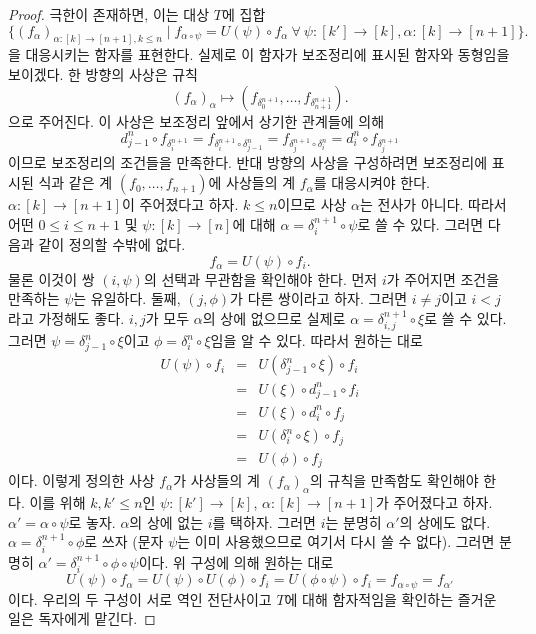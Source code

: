 \begin{proof}
극한이 존재하면, 이는 대상 $T$에 집합
$$
\{
(f_\alpha)_{\alpha : [k] \to [n + 1], k \leq n}
\mid
f_{\alpha \circ \psi} = U(\psi) \circ f_\alpha\ \forall
\ \psi : [k'] \to [k], \alpha : [k] \to [n + 1]
\}.
$$
을 대응시키는 함자를 표현한다.
실제로 이 함자가 보조정리에 표시된 함자와 동형임을 보이겠다.
한 방향의 사상은 규칙
$$
(f_\alpha)_{\alpha}
\longmapsto
(f_{\delta^{n + 1}_0}, \ldots, f_{\delta^{n + 1}_{n + 1}}).
$$
으로 주어진다. 이 사상은 보조정리 앞에서 상기한 관계들에 의해
$$
d^n_{j - 1} \circ f_{\delta^{n + 1}_i} =
f_{\delta^{n + 1}_i \circ \delta^n_{j - 1}} =
f_{\delta^{n + 1}_j \circ \delta^n_i} =
d^n_i \circ f_{\delta^{n + 1}_j}
$$
이므로 보조정리의 조건들을 만족한다.
반대 방향의 사상을 구성하려면 보조정리에 표시된 식과 같은 계
$(f_0, \ldots, f_{n + 1})$에 사상들의 계 $f_\alpha$를 대응시켜야 한다.
$\alpha : [k] \to [n + 1]$이 주어졌다고 하자.
$k \leq n$이므로 사상 $\alpha$는 전사가 아니다.
따라서 어떤 $0 \leq i \leq n + 1$ 및
$\psi : [k] \to [n]$에 대해
$\alpha = \delta^{n + 1}_i \circ \psi$로 쓸 수 있다.
그러면 다음과 같이 정의할 수밖에 없다.
$$
f_\alpha = U(\psi) \circ f_i.
$$
물론 이것이 쌍 $(i, \psi)$의 선택과 무관함을 확인해야 한다.
먼저 $i$가 주어지면 조건을 만족하는 $\psi$는 유일하다.
둘째, $(j, \phi)$가 다른 쌍이라고 하자.
그러면 $i \not = j$이고 $i < j$라고 가정해도 좋다.
$i, j$가 모두 $\alpha$의 상에 없으므로 실제로
$\alpha = \delta^{n + 1}_{i, j} \circ \xi$로 쓸 수 있다.
그러면 $\psi = \delta^n_{j - 1} \circ \xi$이고
$\phi = \delta^n_i \circ \xi$임을 알 수 있다. 따라서 원하는 대로
\begin{eqnarray*}
U(\psi) \circ f_i & = & U(\delta^n_{j - 1} \circ \xi) \circ f_i \\
& = & U(\xi) \circ d^n_{j - 1} \circ f_i \\
& = & U(\xi) \circ d^n_i \circ f_j \\
& = & U(\delta^n_i \circ \xi) \circ f_j \\
& = & U(\phi) \circ f_j
\end{eqnarray*}
이다. 이렇게 정의한 사상 $f_\alpha$가 사상들의 계
$(f_\alpha)_\alpha$의 규칙을 만족함도 확인해야 한다.
이를 위해 $k, k' \leq n$인
$\psi : [k'] \to [k]$, $\alpha : [k] \to [n + 1]$가 주어졌다고 하자.
$\alpha' = \alpha \circ \psi$로 놓자.
$\alpha$의 상에 없는 $i$를 택하자.
그러면 $i$는 분명히 $\alpha'$의 상에도 없다.
$\alpha = \delta^{n + 1}_i \circ \phi$로 쓰자
(문자 $\psi$는 이미 사용했으므로 여기서 다시 쓸 수 없다).
그러면 분명히
$\alpha' = \delta^{n + 1}_i \circ \phi \circ \psi$이다.
위 구성에 의해 원하는 대로
$$
U(\psi) \circ f_\alpha = U(\psi) \circ U(\phi) \circ f_i
= U(\phi \circ \psi) \circ f_i = f_{\alpha \circ \psi} = f_{\alpha'}
$$
이다. 우리의 두 구성이 서로 역인 전단사이고 $T$에 대해 함자적임을
확인하는 즐거운 일은 독자에게 맡긴다.
\end{proof}
